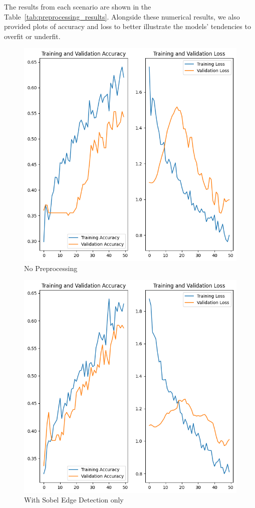 The results from each scenario are shown in the Table~\ref{tab:preprocessing_results}. Alongside these numerical results, we also provided plots of accuracy and loss to better illustrate the models' tendencies to overfit or underfit.

\begin{figure}[H]
  \includegraphics[width=\linewidth]{figures/without_preprocessing.png}
  \caption{No Preprocessing}
  \label{fig:no_preprocessing_plots}
\end{figure}

\begin{figure}[H]
  \includegraphics[width=\linewidth]{figures/training_validation_results.png}
  \caption{With Sobel Edge Detection only}
  \label{fig:sobel_edge_plots}
\end{figure}

